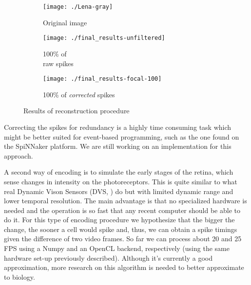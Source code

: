 \begin{figure}
  \centering
  \begin{subfigure}[t]{0.15\textwidth}
    \centering
    \captionsetup{justification=centering,margin=0.1cm}
    \texttt{[image: ./Lena-gray]}
    \caption{Original image}
    \label{pic-original-lena}
  \end{subfigure}
  \begin{subfigure}[t]{0.15\textwidth}
    \centering
    \captionsetup{justification=centering,margin=0.1cm}
    \texttt{[image: ./final\_results-unfiltered]}
    \caption{100\% of \\raw spikes}
    \label{pic-unfiltered-spikes}
  \end{subfigure}
  \begin{subfigure}[t]{0.15\textwidth}
    \centering
    \captionsetup{justification=centering,margin=0.1cm}
    \texttt{[image: ./final\_results-focal-100]}
    \caption{100\% of \emph{corrected} spikes}
    \label{pic-100pc-spikes}
  \end{subfigure}
  \caption{Results of reconstruction procedure}
  \label{fig-reconstruction}
\end{figure}
Correcting the spikes for redundancy is a highly time consuming task which
might be better suited for event-based programming, such as the one found on 
the SpiNNaker platform. We are still working on an implementation for this 
approach.

A second way of encoding is to simulate the early stages of the retina, which
sense changes in intensity on the photoreceptors. This is quite similar to what 
real Dynamic Vison Sensors (DVS, \cite{aer-retina-bernabe,dvs-zurich}) do but 
with limited dynamic range and lower temporal resolution. The main advantage is 
that no specialized hardware is needed and the operation is so fast that any 
recent computer should be able to do it. For this type of encoding procedure we 
hypothesize that the bigger the change, the sooner a cell would spike and, 
thus, we can obtain a spike timings given the difference of two video frames. 
So far we can process about 20 and 25 FPS using a Numpy and an OpenCL backend, 
respectively (using the same hardware set-up previously described). Although 
it's currently a good approximation, more research on this algorithm is needed 
to better approximate to biology. 


